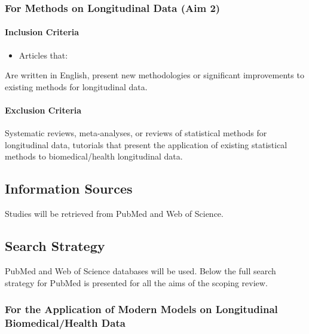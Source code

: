 \documentclass[
]{article}
\let\oldparagraph\paragraph
\renewcommand{\paragraph}[1]{\oldparagraph{#1}\mbox{}}
\providecommand{\tightlist}{%
  \setlength{\itemsep}{0pt}\setlength{\parskip}{0pt}}\usepackage{longtable,booktabs,array}
\begin{document}
\hypertarget{for-methods-on-longitudinal-data-aim-2}{%
\subsubsection{For Methods on Longitudinal Data (Aim
2)}\label{for-methods-on-longitudinal-data-aim-2}}

\hypertarget{inclusion-criteria-1}{%
\paragraph{Inclusion Criteria}\label{inclusion-criteria-1}}

\begin{itemize}
\tightlist
\item
  Articles that:
\end{itemize}

Are written in English, present new methodologies or significant
improvements to existing methods for longitudinal data.

\hypertarget{exclusion-criteria-1}{%
\paragraph{Exclusion Criteria}\label{exclusion-criteria-1}}

Systematic reviews, meta-analyses, or reviews of statistical methods for
longitudinal data, tutorials that present the application of existing
statistical methods to biomedical/health longitudinal data.

\hypertarget{information-sources}{%
\subsection{Information Sources}\label{information-sources}}

Studies will be retrieved from PubMed and Web of Science.

\hypertarget{search-strategy}{%
\subsection{Search Strategy}\label{search-strategy}}

PubMed and Web of Science databases will be used. Below the full search
strategy for PubMed is presented for all the aims of the scoping review.

\hypertarget{for-the-application-of-modern-models-on-longitudinal-biomedicalhealth-data}{%
\subsubsection{For the Application of Modern Models on Longitudinal
Biomedical/Health
Data}\label{for-the-application-of-modern-models-on-longitudinal-biomedicalhealth-data}}
\end{document}
